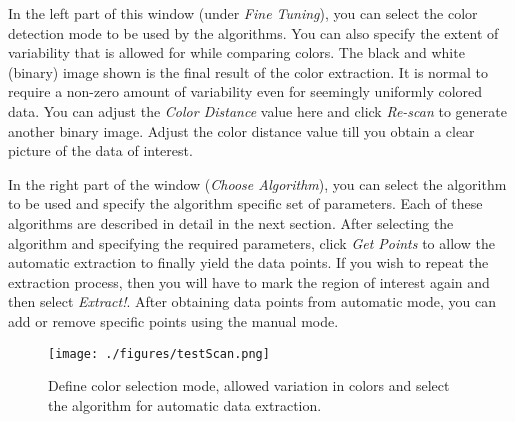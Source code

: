 \documentclass[letterpaper, 10pt]{article}
\begin{document}
In the left part of this window (under \emph{Fine Tuning}), you can select the color detection mode to be used by the algorithms. You can also specify the extent of variability that is allowed for while comparing colors. The black and white (binary) image shown is the final result of the color extraction. It is normal to require a non-zero amount of variability even for seemingly uniformly colored data. You can adjust the \emph{Color Distance} value here and click \emph{Re-scan} to generate another binary image. Adjust the color distance value till you obtain a clear picture of the data of interest.

In the right part of the window (\emph{Choose Algorithm}), you can select the algorithm to be used and specify the algorithm specific set of parameters. Each of these algorithms are described in detail in the next section. After selecting the algorithm and specifying the required parameters, click \emph{Get Points} to allow the automatic extraction to finally yield the data points. If you wish to repeat the extraction process, then you will have to mark the region of interest again and then select \emph{Extract!}. After obtaining data points from automatic mode, you can add or remove specific points using the manual mode.

\begin{figure}
\begin{center}
\texttt{[image: ./figures/testScan.png]}
\caption{Define color selection mode, allowed variation in colors and select the algorithm for automatic data extraction.}
\label{fig:testScan}
\end{center}
\end{figure}
\end{document}
